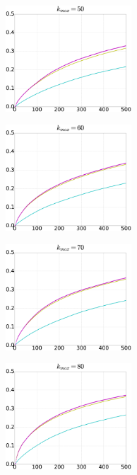 \documentclass[dvipdfmx]{ampbt}
\begin{document}
\begin{figure}[htbp]
\begin{minipage}{0.33\hsize}
\begin{center}
     \end{center}
     \label{fig:21}
    \end{minipage}\begin{minipage}{0.33\hsize}
     \begin{center}
      \includegraphics[width=47mm]{../fig/cml_50clip.eps}
     \end{center}
     \label{fig:22}
    \end{minipage}\begin{minipage}{0.33\hsize}
     \begin{center}
      \includegraphics[width=47mm]{../fig/cml_60clip.eps}
     \end{center}
     \label{fig:23}
    \end{minipage}
    \begin{minipage}{0.33\hsize}
     \begin{center}
      \includegraphics[width=47mm]{../fig/cml_70clip.eps}
     \end{center}
     \label{fig:31}
    \end{minipage}\begin{minipage}{0.33\hsize}
     \begin{center}
      \includegraphics[width=47mm]{../fig/cml_80clip.eps}

\end{center}
\end{minipage}
\end{figure}
\end{document}
